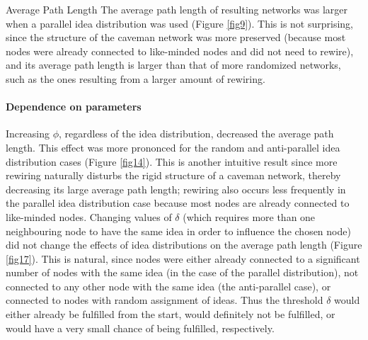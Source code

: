 \documentclass{beamer}
\begin{document}
%
\begin{frame}
{Average Path Length}
The average path length of resulting networks was larger when a parallel idea distribution was used (Figure \ref{fig9}). This is not surprising, since the structure of the caveman network was more preserved (because most nodes were already connected to like-minded nodes and did not need to rewire), and its average path length is larger than that of more randomized networks, such as the ones resulting from a larger amount of rewiring. 
\paragraph{Dependence on parameters}
Increasing $\phi$, regardless of the idea distribution, decreased the average path length. This effect was more prononced for the random and anti-parallel idea distribution cases (Figure \ref{fig14}). This is another intuitive result since more rewiring naturally disturbs the rigid structure of a caveman network, thereby decreasing its large average path length; rewiring also occurs less frequently in the parallel idea distribution case because most nodes are already connected to like-minded nodes.
Changing values of $\delta$ (which requires more than one neighbouring node to have the same idea in order to influence the chosen node) did not change the effects of idea distributions on the average path length (Figure \ref{fig17}). This is natural, since nodes were either already connected to a significant number of nodes with the same idea (in the case of the parallel distribution), not connected to any other node with the same idea (the anti-parallel case), or connected to nodes with random assignment of ideas. Thus the threshold $\delta$ would either already be fulfilled from the start, would definitely not be fulfilled, or would have a very small chance of being fulfilled, respectively.


\end{frame}
\end{document}

